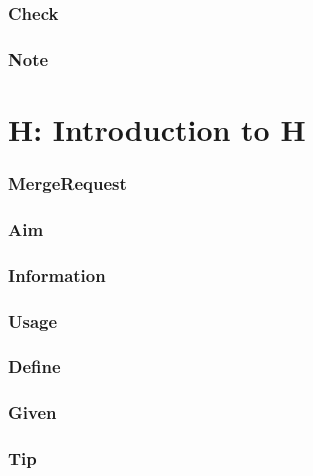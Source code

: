 \documentclass[]{book}
\begin{document}
\subsubsection*{Check}\label{check-19}

\subsubsection*{Note}\label{note-21}

\section{H: Introduction to H}\label{h-introduction-to-h}

\subsubsection*{MergeRequest}\label{mergerequest-21}

\subsubsection*{Aim}\label{aim-21}

\subsubsection*{Information}\label{information-20}

\subsubsection*{Usage}\label{usage-20}

\subsubsection*{Define}\label{define-20}

\subsubsection*{Given}\label{given-20}

\subsubsection*{Tip}\label{tip-20}
\end{document}
